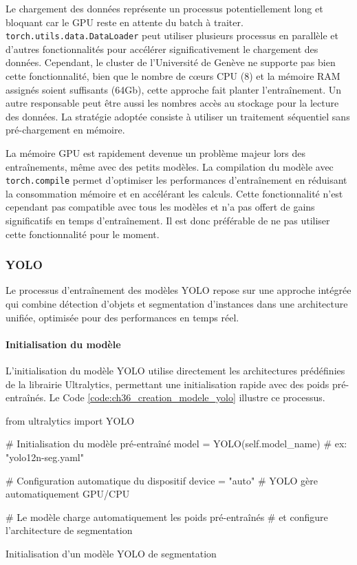 Le chargement des données représente un processus potentiellement long et bloquant car le GPU reste en attente du batch à traiter. \texttt{torch.utils.data.DataLoader} peut utiliser plusieurs processus en parallèle et d'autres fonctionnalités pour accélérer significativement le chargement des données. Cependant, le cluster de l'Université de Genève ne supporte pas bien cette fonctionnalité, bien que le nombre de cœurs CPU (8) et la mémoire RAM assignés soient suffisants (64Gb), cette approche fait planter l'entraînement. Un autre responsable peut être aussi les nombres accès au stockage pour la lecture des données. La stratégie adoptée consiste à utiliser un traitement séquentiel sans pré-chargement en mémoire.

La mémoire GPU est rapidement devenue un problème majeur lors des entraînements, même avec des petits modèles. La compilation du modèle avec \texttt{torch.compile} permet d'optimiser les performances d'entraînement en réduisant la consommation mémoire et en accélérant les calculs. Cette fonctionnalité n'est cependant pas compatible avec tous les modèles et n'a pas offert de gains significatifs en temps d'entraînement. Il est donc préférable de ne pas utiliser cette fonctionnalité pour le moment.

\subsubsection{YOLO}
Le processus d'entraînement des modèles YOLO repose sur une approche intégrée qui combine détection d'objets et segmentation d'instances dans une architecture unifiée, optimisée pour des performances en temps réel.

\paragraph{Initialisation du modèle}
L'initialisation du modèle YOLO utilise directement les architectures prédéfinies de la librairie Ultralytics, permettant une initialisation rapide avec des poids pré-entraînés. Le Code \ref{code:ch36_creation_modele_yolo} illustre ce processus.

\begin{code}[H]
    \begin{pythoncode}
        from ultralytics import YOLO
        
        # Initialisation du modèle pré-entraîné
        model = YOLO(self.model_name)  # ex: "yolo12n-seg.yaml"
        
        # Configuration automatique du dispositif
        device = "auto"  # YOLO gère automatiquement GPU/CPU
        
        # Le modèle charge automatiquement les poids pré-entraînés
        # et configure l'architecture de segmentation
    \end{pythoncode}
    \caption{Initialisation d'un modèle YOLO de segmentation}
    \label{code:ch36_creation_modele_yolo}
\end{code}

